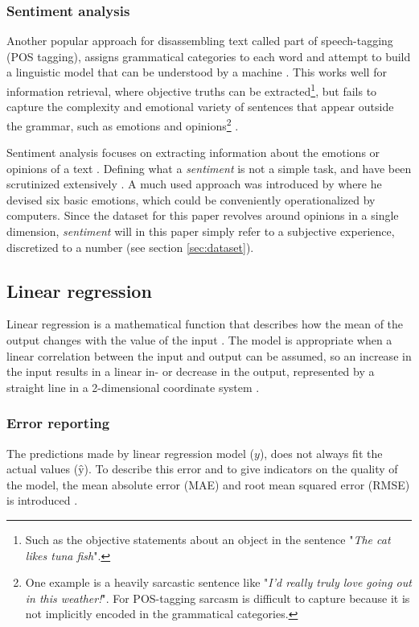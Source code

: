 \documentclass[a4paper]{article}
\begin{document}
\subsubsection{Sentiment analysis}
Another popular approach for disassembling text
called part of speech-tagging (POS tagging), assigns grammatical categories
to each word and attempt to build a linguistic model that can be understood by
a machine \citep{Jurafsky2000}. This works well for information retrieval,
where objective truths can be extracted\footnote{Such as the objective statements about an object in the
sentence "\textit{The cat likes tuna fish}".}, but fails
to capture the complexity and emotional variety of sentences that appear
outside the grammar, such as emotions and opinions\footnote{One example is a heavily sarcastic sentence like
"\textit{I'd really truly love going out in this weather!}". For POS-tagging
sarcasm is difficult to capture because it is not implicitly encoded in the
grammatical categories.} \citep{Jurafsky2000}.
\label{text:irony}

Sentiment analysis focuses on extracting information about the emotions or
opinions of a text \citep{PangLee2008}.
Defining what a \textit{sentiment} is not a simple task, and have been
scrutinized extensively \citep{Jurafsky2000, PangLee2008}.
A much used approach was introduced by \cite{Ekman92} where he devised six
basic emotions, which could be conveniently operationalized by computers.
Since the dataset for this paper revolves around opinions in a single dimension,
\textit{sentiment} will in this paper simply refer to a subjective experience,
discretized to a number (see section \ref{sec:dataset}).

\subsection{Linear regression}
Linear regression is a mathematical function that describes how the mean of the
output changes with the value of the input \citep{Agresti2008}. The model is
appropriate when a linear correlation between the input and output can be
assumed, so an increase in the input results in a linear in- or decrease in
the output, represented by a straight line in a 2-dimensional coordinate system
\citep{Agresti2008}.

\subsubsection{Error reporting}
The predictions made by linear regression model ($y$), does not always fit
the actual values ($ŷ$). To describe this error and to give indicators on the
quality of the model, the mean absolute error (MAE) and root mean squared
error (RMSE) is introduced \citep{Agresti2008, Chai2014}.
\end{document}
